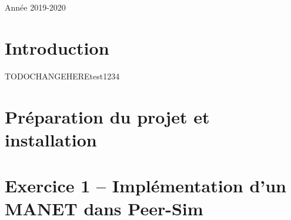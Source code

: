 \documentclass[11pt,a4paper,sans]{report}
\begin{document}
\begin{titlepage}
{\large Année 2019-2020}\\[2cm] %





\end{titlepage}

\newpage
\tableofcontents
\vspace*{3cm}
\begingroup\let\clearpage\relax

\newpage
\chapter{Introduction}

\begin{comment}
TODO intro du projet, nos remarques. + Explication du fichier de config accompagnées d’un fichier texte "Readme"
indiquant comment compiler le projet et lancer les différentes simulations (votre projet doit pouvoir se compiler/lancer en dehors d’Eclipse) Votre rapport, au format pdf, concis, dans lequel vous devez répondre aux questions posées dans le sujet.
\end{comment}

TODOCHANGEHEREtest1234\cite{greenwade93}

\newpage
\chapter{Préparation du projet et installation}
\newpage
\chapter{Exercice 1 – Implémentation d’un MANET dans Peer-Sim}
\end{document}
